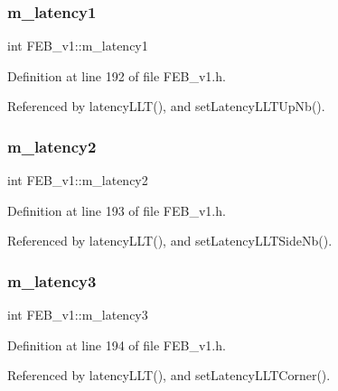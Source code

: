 \subsubsection{\texorpdfstring{m\+\_\+latency1}{m\_latency1}}
{\footnotesize\ttfamily int F\+E\+B\+\_\+v1\+::m\+\_\+latency1\hspace{0.3cm}{\ttfamily [private]}}



Definition at line 192 of file F\+E\+B\+\_\+v1.\+h.



Referenced by latency\+L\+L\+T(), and set\+Latency\+L\+L\+T\+Up\+Nb().

\mbox{\label{classFEB__v1_a2c4b18efd76de3bf7089bba57fb6744f}} 
\subsubsection{\texorpdfstring{m\+\_\+latency2}{m\_latency2}}
{\footnotesize\ttfamily int F\+E\+B\+\_\+v1\+::m\+\_\+latency2\hspace{0.3cm}{\ttfamily [private]}}



Definition at line 193 of file F\+E\+B\+\_\+v1.\+h.



Referenced by latency\+L\+L\+T(), and set\+Latency\+L\+L\+T\+Side\+Nb().

\mbox{\label{classFEB__v1_a2f71bdcef05c845177a62610da490bf9}} 
\subsubsection{\texorpdfstring{m\+\_\+latency3}{m\_latency3}}
{\footnotesize\ttfamily int F\+E\+B\+\_\+v1\+::m\+\_\+latency3\hspace{0.3cm}{\ttfamily [private]}}



Definition at line 194 of file F\+E\+B\+\_\+v1.\+h.



Referenced by latency\+L\+L\+T(), and set\+Latency\+L\+L\+T\+Corner().

